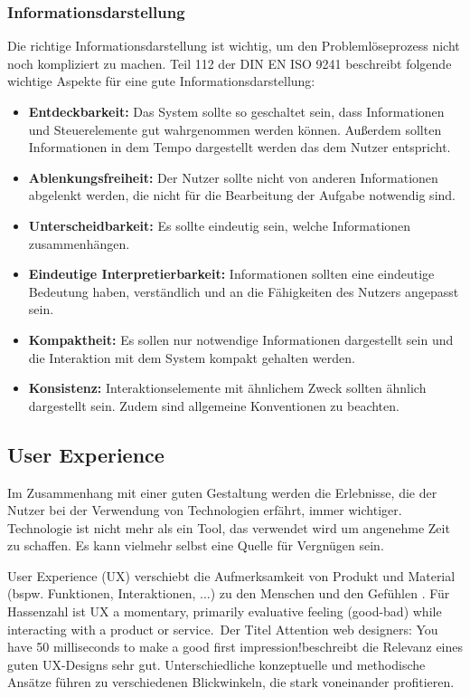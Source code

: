 \subsubsection*{Informationsdarstellung}
Die richtige Informationsdarstellung ist wichtig, um den Problemlöseprozess nicht noch kompliziert zu machen. Teil 112 \cite{ISO9241-112} der DIN EN ISO 9241 beschreibt folgende wichtige Aspekte für eine gute Informationsdarstellung:
\begin{itemize}
\item \textbf{Entdeckbarkeit:} Das System sollte so geschaltet sein, dass Informationen und Steuerelemente gut wahrgenommen werden können. Außerdem sollten Informationen in dem Tempo dargestellt werden das dem Nutzer entspricht.
\item \textbf{Ablenkungsfreiheit:} Der Nutzer sollte nicht von anderen Informationen abgelenkt werden, die nicht für die Bearbeitung der Aufgabe notwendig sind.
\item \textbf{Unterscheidbarkeit:} Es sollte eindeutig sein, welche Informationen zusammenhängen.
\item \textbf{Eindeutige Interpretierbarkeit:} Informationen sollten eine eindeutige Bedeutung haben, verständlich und an die Fähigkeiten des Nutzers angepasst sein.
\item \textbf{Kompaktheit:} Es sollen nur notwendige Informationen dargestellt sein und die Interaktion mit dem System kompakt gehalten werden.
\item \textbf{Konsistenz:} Interaktionselemente mit ähnlichem Zweck sollten ähnlich dargestellt sein. Zudem sind allgemeine Konventionen zu beachten.
\end{itemize}

\subsection{User Experience}
Im Zusammenhang mit einer guten Gestaltung werden die Erlebnisse, die der Nutzer bei der Verwendung von Technologien erfährt, immer wichtiger. Technologie ist nicht mehr als ein Tool, das verwendet wird um angenehme Zeit zu schaffen. Es kann vielmehr selbst eine Quelle für Vergnügen sein. \cite{Hassenzahl2008}

User Experience (UX) verschiebt die Aufmerksamkeit von Produkt und Material (bspw. Funktionen, Interaktionen, ...) zu den Menschen und den Gefühlen \cite{Hassenzahl2008}. Für Hassenzahl \citep[12]{Hassenzahl2008} ist UX \glqq a momentary, primarily evaluative feeling (good-bad) while interacting with a product or service.\grqq \ Der Titel \glqq Attention web designers: You have 50 milliseconds to make a good first impression!\grqq beschreibt die Relevanz eines guten UX-Designs sehr gut. Unterschiedliche konzeptuelle und methodische Ansätze führen zu verschiedenen Blickwinkeln, die stark voneinander profitieren. \cite{Hassenzahl2006}

